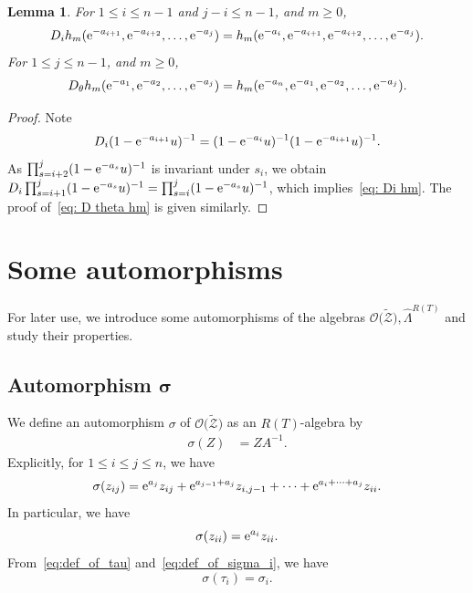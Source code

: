 \documentclass[10pt,a4paper]{amsart}
\numberwithin{equation}{section}
\newcommand{\Rep}{{R(T)}}
\newtheorem{Lemma}[Theorem]{Lemma}
\theoremstyle{definition}
\begin{document}
\begin{Lemma}\label{lem:T_on_h}
For
$1\le i\le n-1$ and $j-i\le n-1$, and $m\ge 0$,
\begin{equation}
D_{i}
h_m({\rm e}^{-a_{i+1}},{\rm e}^{-a_{i+2}},\dots,{\rm e}^{-a_j})
=
h_m({\rm e}^{-a_{i}},{\rm e}^{-a_{i+1}},{\rm e}^{-a_{i+2}},\dots,{\rm e}^{-a_j}).
\label{eq: Di hm}
\end{equation}
For $1\le j\le n-1$, and $m\ge 0$,
\begin{equation}
D_{\theta}
h_m({\rm e}^{-a_{1}},{\rm e}^{-a_{2}},\dots,{\rm e}^{-a_j})
=
h_m({\rm e}^{-a_{n}},{\rm e}^{-a_{1}},{\rm e}^{-a_{2}},\dots,{\rm e}^{-a_j}).
\label{eq: D theta hm}
\end{equation}
\end{Lemma}
\begin{proof}
Note
\begin{equation*}
D_i (1-{\rm e}^{-a_{i+1}}u)^{-1}=
(1-{\rm e}^{-a_{i}}u)^{-1}
(1-{\rm e}^{-a_{i+1}}u)^{-1}.
\end{equation*}
As $\prod_{s=i+2}^j(1-{\rm e}^{-a_s}u)^{-1}$ is invariant under $s_i$, we obtain
$D_i\prod_{s=i+1}^j(1-{\rm e}^{-a_s}u)^{-1}=
\prod_{s=i}^j(1-{\rm e}^{-a_s}u)^{-1}$, which implies~\eqref{eq: Di hm}.
The proof of~\eqref{eq: D theta hm} is given similarly.
\end{proof}


\section{Some automorphisms}\label{sec:auto}
For later use, we introduce
some automorphisms of the algebras $\mathscr{O}\bigl(\tilde{\mathscr{Z}}\bigr), \hat{\Lambda}^{\Rep}$
and study their properties.
\subsection[Automorphism sigma]{Automorphism $\boldsymbol{\sigma}$}\label{sec:sigma}

We define an automorphism $\sigma$
of $\mathscr{O}\bigl(\tilde{\mathscr{Z}}\bigr)$ as an $\Rep$-algebra
by
\begin{align}\label{eq:def_of_sigma}
\sigma(Z)&=ZA^{-1}.
\end{align}
Explicitly,
for $1\le i\le j\le n$,
we have
\[
\sigma(z_{ij})={\rm e}^{a_j}z_{ij}+
{\rm e}^{a_{j-1}+a_j}z_{i,j-1}+\cdots+{\rm e}^{a_i+\cdots+a_j}
z_{ii}.
\]
In particular,
we have
\begin{equation}
\label{eq:sigma_zii}
\sigma(z_{ii})={\rm e}^{a_i}z_{ii}.
\end{equation}
From~\eqref{eq:def_of_tau} and~\eqref{eq:def_of_sigma_i}, we have
\begin{equation}\label{eq:sigma_tau_i}
\sigma(\tau_i)=\sigma_i.
\end{equation}
\end{document}
